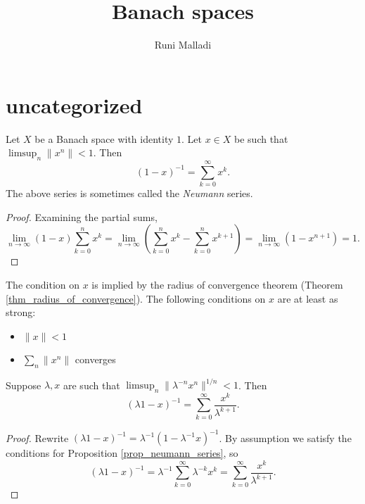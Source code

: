 \documentclass[12pt]{article}
\title{Banach spaces}
\author{Runi Malladi}
\begin{document}
\maketitle

\section{uncategorized} %
\begin{refsection}

\begin{proposition}
\label{prop_neumann_series}
	Let $X$ be a Banach space with identity $1$. Let $x\in X$ be such that $\limsup_n \|x^n\| < 1$. Then 
	\begin{equation*}
		(1 - x)^{-1} = \sum_{k=0}^\infty x^k.
	\end{equation*}
	The above series is sometimes called the \emph{Neumann} series.
\end{proposition}
\begin{proof}
	Examining the partial sums,
	\begin{equation*}
	\lim_{n\to\infty} (1 - x)\sum_{k=0}^n x^k = \lim_{n\to\infty} \left(\sum_{k=0}^n x^k - \sum_{k=0}^n x^{k+1}\right) = \lim_{n\to\infty}(1 - x^{n+1}) = 1.
	\end{equation*}
\end{proof}

\begin{remark}
	The condition on $x$ is implied by the radius of convergence theorem (Theorem \ref{thm_radius_of_convergence}). The following conditions on $x$ are at least as strong:
	\begin{itemize}
		\item $\|x\|<1$
		\item $\sum_n \|x^n\|$ converges
	\end{itemize}
\end{remark}

\begin{corollary}
\label{cor_hadamard_formula}
	Suppose $\lambda, x$ are such that $\limsup_n \|\lambda^{-n}x^n\|^{1/n} < 1$. Then 
	\begin{equation*}
		(\lambda 1 - x)^{-1} = \sum_{k=0}^\infty \frac{x^k}{\lambda^{k+1}}.
	\end{equation*}
\end{corollary}
\begin{proof}
	Rewrite $(\lambda 1 - x)^{-1} = \lambda^{-1}(1 - \lambda^{-1}x)^{-1}$. By assumption we satisfy the conditions for Proposition \ref{prop_neumann_series}, so 
	\begin{equation*}
		(\lambda 1 -x)^{-1} = \lambda^{-1}\sum_{k=0}^\infty \lambda^{-k}x^k = \sum_{k=0}^\infty \frac{x^k}{\lambda^{k+1}}.
	\end{equation*}
\end{proof}


\end{refsection}
\end{document}
